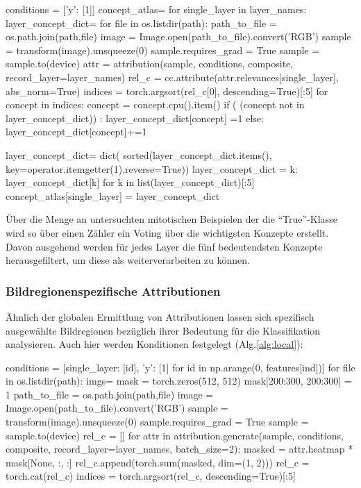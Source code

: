 \begin{python}[caption={Bestimmung der wichtigsten Konzepte zur Mitosen-Klassifikation im latenten Raum über alle Samples (Auszug aus der Methode \lstinline{latent_attribute_imgs()})},
label=alg:latent]
conditions = [{'y': [1]}]
concept_atlas={}  
for single_layer in layer_names:
    layer_concept_dict={}
    for file in os.listdir(path):
        path_to_file = os.path.join(path,file)
        image = Image.open(path_to_file).convert('RGB')
        sample = transform(image).unsqueeze(0)
        sample.requires_grad = True
        sample = sample.to(device)  
        attr = attribution(sample, conditions, composite, record_layer=layer_names)
        rel_c = cc.attribute(attr.relevances[single_layer], abs_norm=True)
        indices = torch.argsort(rel_c[0], descending=True)[:5]
        for concept in indices:
            concept = concept.cpu().item()
            if ( (concept not in layer_concept_dict)) :
                layer_concept_dict[concept] =1
            else:
                layer_concept_dict[concept]+=1 
                
    layer_concept_dict= dict( sorted(layer_concept_dict.items(),
                                key=operator.itemgetter(1),reverse=True))
    layer_concept_dict  = {k: layer_concept_dict[k] for k 
                                in list(layer_concept_dict)[:5]}
    concept_atlas[single_layer] = layer_concept_dict
\end{python}

Über die Menge an untersuchten mitotischen Beispielen der die ``True''-Klasse wird so über einen Zähler ein Voting über die wichtigsten Konzepte erstellt. Davon ausgehend werden für jedes Layer die fünf bedeutendsten Konzepte herausgefiltert, um diese als  weiterverarbeiten zu können.

\subsubsection{Bildregionenspezifische Attributionen}
Ähnlich der globalen Ermittlung von Attributionen lassen sich spezifisch ausgewählte Bildregionen bezüglich ihrer Bedeutung für die Klassifikation analysieren.
Auch hier werden Konditionen festgelegt (Alg.\ref{alg:local}):
\begin{python}[caption={Ermittlung für Regionen im Eingabebereich zur Klassifikation beitragenden Konzepte (Auszug aus der Methode \lstinline{local_attribute_imgs()})},label=alg:local]
conditions = [{single_layer: [id], 'y': [1]} for id in np.arange(0, features[ind])]
for file in os.listdir(path):
    imgs={}
    mask = torch.zeros(512, 512)
    mask[200:300, 200:300] = 1
    path_to_file = os.path.join(path,file)
    image = Image.open(path_to_file).convert('RGB')
    sample = transform(image).unsqueeze(0)
    sample.requires_grad = True
    sample = sample.to(device)
    rel_c = []
    for attr in attribution.generate(sample, conditions, composite, 
                                record_layer=layer_names, batch_size=2):
        masked = attr.heatmap * mask[None, :, :]
        rel_c.append(torch.sum(masked, dim=(1, 2)))
    rel_c = torch.cat(rel_c)
    indices = torch.argsort(rel_c, descending=True)[:5]
\end{python}


